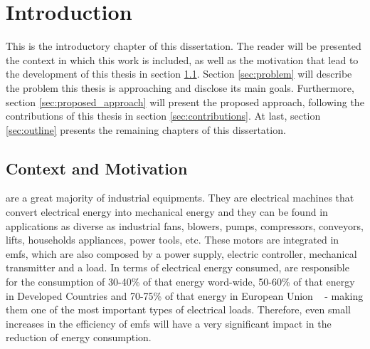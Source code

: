 \newcommand{\unlthesis}{\emph{unlthesis}}
\newcommand{\unlthesisclass}{\texttt{unlthesis.cls}}

\chapter{Introduction}  
\label{cha:introduction} 

This is the introductory chapter of this dissertation. The reader will be presented the context in which this work is included, as well as the motivation that lead to the development of this thesis in section \ref{sec:motivation}. Section \ref{sec:problem} will describe the problem this thesis is approaching and disclose its main goals. Furthermore, section \ref{sec:proposed_approach} will present the proposed approach, following the contributions of this thesis in section \ref{sec:contributions}. At last, section \ref{sec:outline} presents the remaining chapters of this dissertation.

\section{Context and Motivation} %
\label{sec:motivation}


 are a great majority of industrial equipments. They are electrical machines that convert electrical energy into mechanical energy and they can be found in applications as diverse as industrial fans, blowers, pumps, compressors, conveyors, lifts, households appliances, power tools, etc. 
These motors are integrated in \acrfull{emfs}, which are also composed by a power supply, electric controller, mechanical transmitter and a load. 
In terms of electrical energy consumed,  are responsible for the consumption of 30-40\% of that energy word-wide, 50-60\% of that energy in Developed Countries and 70-75\% of that energy in European Union ~\cite{Ferreira1} - making them one of the most important types of electrical loads. 
Therefore, even small increases in the efficiency of \acrshort{emfs} will have a very significant impact in the reduction of energy consumption.



